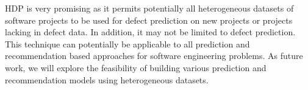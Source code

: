 HDP is very promising as it permits potentially all heterogeneous datasets
of software projects to be used for defect prediction on new projects or
projects lacking in defect data.
In addition, it may not be limited to defect prediction. This technique can
potentially be applicable to all prediction and recommendation based approaches
for software engineering problems.
As future work, we will explore the feasibility of building various prediction
and recommendation models using heterogeneous datasets.





